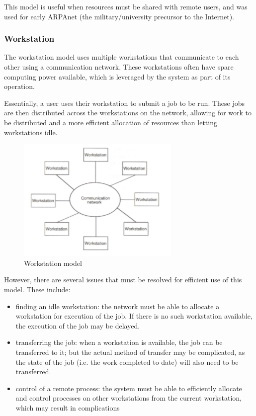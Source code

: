 This model is useful when resources must be shared with remote users, and was used for early ARPAnet (the military/university precursor to the Internet).

\subsubsection{Workstation}
The workstation model uses multiple workstations that communicate to each other using a communication network. These workstations often have spare computing power available, which is leveraged by the system as part of its operation.

Essentially, a user uses their workstation to submit a job to be run. These jobs are then distributed across the workstations on the network, allowing for work to be distributed and a more efficient allocation of resources than letting workstations idle.

\begin{figure}[h]
\centering
\includegraphics[width=0.5\linewidth]{screenshot004}
\caption{Workstation model}
\label{fig:screenshot004}
\end{figure}

However, there are several issues that must be resolved for efficient use of this model. These include:
\begin{itemize}
\item finding an idle workstation: the network must be able to allocate a workstation for execution of the job. If there is no such workstation available, the execution of the job may be delayed.
\item transferring the job: when a workstation is available, the job can be transferred to it; but the actual method of transfer may be complicated, as the state of the job (i.e. the work completed to date) will also need to be transferred.
\item control of a remote process: the system must be able to efficiently allocate and control processes on other workstations from the current workstation, which may result in complications
\end{itemize}

